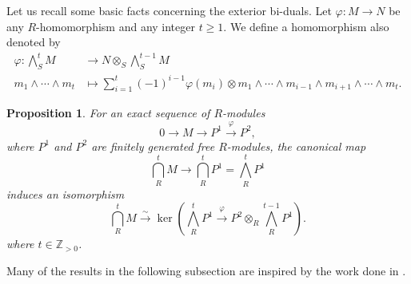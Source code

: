 \documentclass[10pt]{amsart}
\numberwithin{equation}{section}
\newtheorem{thm}{Theorem}[section]
\newtheorem{prop}[thm]{Proposition}
\theoremstyle{definition}
\newtheorem{defn}[thm]{Definition}
\theoremstyle{remark} %
\newcommand{\Z}{\mathbb{Z}}
\begin{document}
	Let us recall some basic facts concerning the exterior bi-duals.	
		Let $\varphi \colon M \longrightarrow N$ be any $R$-homomorphism and any integer $t \geq 1$. We define a homomorphism also denoted by
		\begin{align*}
			\varphi \colon {\bigwedge}^t_S M &\longrightarrow  N \otimes_{S} {\bigwedge}^{t-1}_S M \\
			m_1 \wedge \cdots \wedge m_t &\mapsto \sum_{i=1}^t(-1)^{i-1}\varphi(m_i) \otimes m_1 \wedge \cdots \wedge m_{i-1 } \wedge m_{i+1} \wedge \cdots \wedge  m_t. 
		\end{align*}
		\begin{prop}\cite[Lemma B.2]{BS22}
			\label{proposition_exterior_wedge}
			For an exact sequence of $R$-modules 
			\[
			0 \longrightarrow M \longrightarrow P^1 \stackrel{\varphi}{\longrightarrow} P^2, 
			\]
			where $P^1$ and $P^2$ are finitely generated free $R$-modules, the canonical map 
			\[
			{\bigcap}^t_{R}M \longrightarrow {\bigcap}^t_{R}P^1 = {\bigwedge}^t_{R}P^1
			\]
			induces an isomorphism 
			\[
			{\bigcap}^t_{R}M \stackrel{\sim}{\longrightarrow} \ker\left({\bigwedge}^t_{R}P^1 \stackrel{\varphi}{\longrightarrow} P^2 \otimes_R  {\bigwedge}^{t-1}_{R}P^1\right). 
			\]
			where $t \in \Z_{>0}$.
		\end{prop}
		Many of the results in the following subsection are inspired by the work done in \cite{BCS23}.
		
		
		
\end{document}

